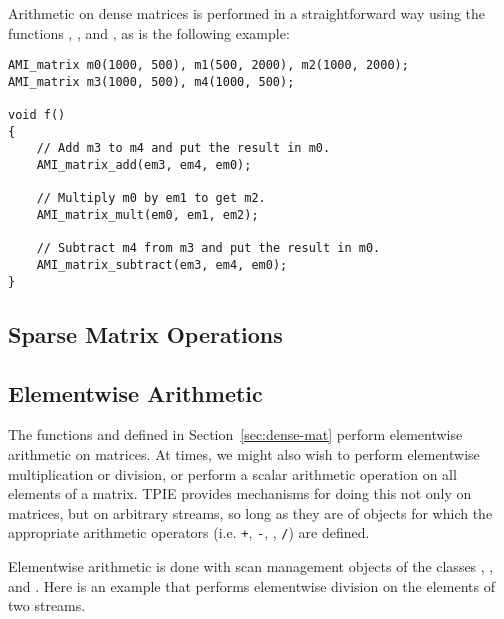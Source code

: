 Arithmetic on dense matrices is performed in a straightforward way
using the functions ,
, and , as is
the following example:

\begin{verbatim}
AMI_matrix m0(1000, 500), m1(500, 2000), m2(1000, 2000);
AMI_matrix m3(1000, 500), m4(1000, 500);

void f()
{
    // Add m3 to m4 and put the result in m0.
    AMI_matrix_add(em3, em4, em0);
   
    // Multiply m0 by em1 to get m2.
    AMI_matrix_mult(em0, em1, em2);

    // Subtract m4 from m3 and put the result in m0.
    AMI_matrix_subtract(em3, em4, em0);        
}
\end{verbatim}


\subsection{Sparse Matrix Operations}
\label{sec:sparse-mat}


\tobewritten


\subsection{Elementwise Arithmetic}
\label{sec:elementwise}

The functions 
and  defined in
Section~\ref{sec:dense-mat} perform elementwise arithmetic on
matrices.  At times, we might also wish to perform elementwise
multiplication or division, or perform a scalar arithmetic operation
on all elements of a matrix.  TPIE provides mechanisms for doing this
not only on matrices, but on arbitrary streams, so long as they are of
objects for which the appropriate arithmetic operators (i.e. {\tt +},
{\tt -}, {\tt *}, {\tt /}) are defined.

Elementwise arithmetic is done with scan management objects
 of the classes
, ,  and
.  Here is an example that performs
elementwise division on the elements of two streams.

